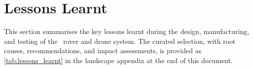 %
%

\section{Lessons Learnt}
\label{sec:lessons_learnt}

This section summarises the key lessons learnt during the design,
manufacturing, and testing of the \projectname\ rover and drone system. The
curated selection, with root causes, recommendations, and impact
assessments, is provided as \autoref{tab:lessons_learnt} in the landscape
appendix at the end of this document.

